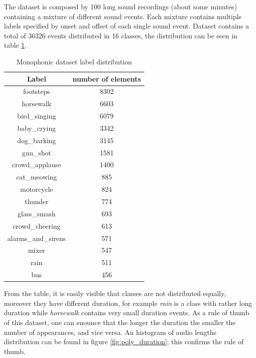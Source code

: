\documentclass{article}
\begin{document}
The dataset is composed by 100 long sound recordings (about some minutes) containing a mixture of different sound events. Each mixture contains multiple labels specified by onset and offset of each single sound event. Dataset contains a total of 36326 events distributed in 16 classes, the distribution can be seen in table \ref{tab:poly_distribution}.

\begin{table}[H]
	\begin{center}
		\begin{tabular}{ |c | c | }
			\hline
			Label 				& number of elements \\ 
			\hline
			footsteps 			& 8302 \\
			\hline
			horsewalk			& 6603 \\
			\hline
			bird\_singing 		& 6079 \\
			\hline
			baby\_crying 		& 3342 \\
			\hline
			dog\_barking 		& 3145 \\
			\hline
			gun\_shot 			& 1581 \\
			\hline
			crowd\_applause 	& 1400 \\
			\hline
			cat\_meowing 		& 885 \\
			\hline
			motorcycle 			& 824 \\
			\hline
			thunder 			& 774 \\
			\hline
			glass\_smash 		& 693 \\
			\hline
			crowd\_cheering 	& 613 \\
			\hline
			alarms\_and\_sirens & 571 \\
			\hline
			mixer 				& 547 \\
			\hline
			rain 				& 511 \\
			\hline
			bus 				& 456 \\
			\hline
		\end{tabular}
		\caption{Monophonic dataset label distribution}
		\label{tab:poly_distribution}
	\end{center}
\end{table}

From the table, it is easily visible that classes are not distributed equally, moreover they have different duration, for example \textit{rain} is a class with rather long duration while \textit{horsewalk} contains very small duration events. As a rule of thumb of this dataset, one can enounce that the longer the duration the smaller the number of appearances, and vice versa. An histogram of audio lengths distribution can be found in figure \ref{fig:poly_duration}; this confirms the rule of thumb.
\end{document}
